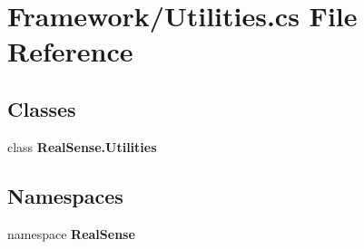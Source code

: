 \section{Framework/\+Utilities.cs File Reference}
\label{_utilities_8cs}
\subsection*{Classes}
\begin{DoxyCompactItemize}
\item 
class \textbf{ Real\+Sense.\+Utilities}
\end{DoxyCompactItemize}
\subsection*{Namespaces}
\begin{DoxyCompactItemize}
\item 
namespace \textbf{ Real\+Sense}
\end{DoxyCompactItemize}
